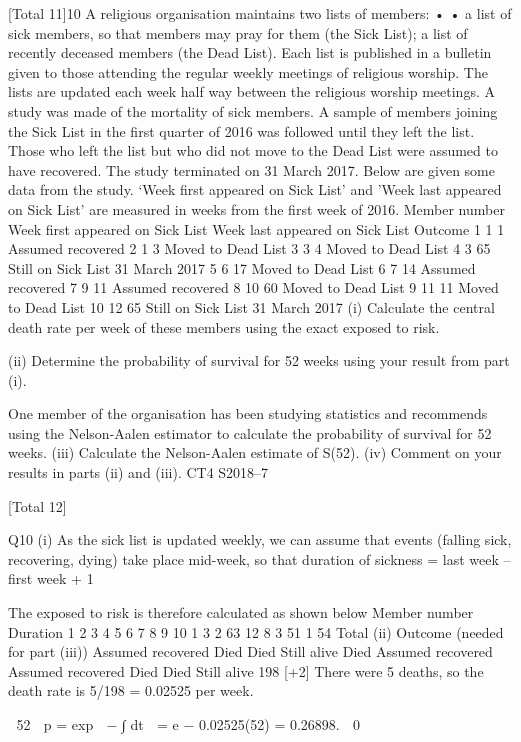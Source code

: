 \documentclass[a4paper,12pt]{article}
\begin{document}
[Total 11]10
A religious organisation maintains two lists of members:
•
•
a list of sick members, so that members may pray for them (the Sick List);
a list of recently deceased members (the Dead List).
Each list is published in a bulletin given to those attending the regular weekly
meetings of religious worship. The lists are updated each week half way between the
religious worship meetings.
A study was made of the mortality of sick members. A sample of members joining
the Sick List in the first quarter of 2016 was followed until they left the list. Those
who left the list but who did not move to the Dead List were assumed to have
recovered. The study terminated on 31 March 2017.
Below are given some data from the study. ‘Week first appeared on Sick List’ and
'Week last appeared on Sick List' are measured in weeks from the first week of 2016.
Member
number Week first
appeared on
Sick List Week last
appeared on
Sick List Outcome
1 1 1 Assumed recovered
2 1 3 Moved to Dead List
3 3 4 Moved to Dead List
4 3 65 Still on Sick List 31 March 2017
5 6 17 Moved to Dead List
6 7 14 Assumed recovered
7 9 11 Assumed recovered
8 10 60 Moved to Dead List
9 11 11 Moved to Dead List
10 12 65 Still on Sick List 31 March 2017
(i) Calculate the central death rate per week of these members using the exact
exposed to risk.

(ii) Determine the probability of survival for 52 weeks using your result from
part (i).

One member of the organisation has been studying statistics and recommends using
the Nelson-Aalen estimator to calculate the probability of survival for 52 weeks.
(iii) Calculate the Nelson-Aalen estimate of S(52).
(iv)
 Comment on your results in parts (ii) and (iii).
CT4 S2018–7 

[Total 12]



Q10
(i)
As the sick list is updated weekly, we can assume
that events (falling sick, recovering, dying) take place mid-week,
so that
duration of sickness = last week – first week + 1

The exposed to risk is therefore calculated as shown below
Member number
Duration
1
2
3
4
5
6
7
8
9
10
1
3
2
63
12
8
3
51
1
54
Total
(ii)
Outcome (needed for part
(iii))
Assumed recovered
Died
Died
Still alive
Died
Assumed recovered
Assumed recovered
Died
Died
Still alive
198
[+2]
There were 5 deaths, 
so the death rate is 5/198 = 0.02525 per week. 

 52

p = exp  − ∫ \mu dt  = e − 0.02525(52) = 0.26898.
 0

\end{document}
